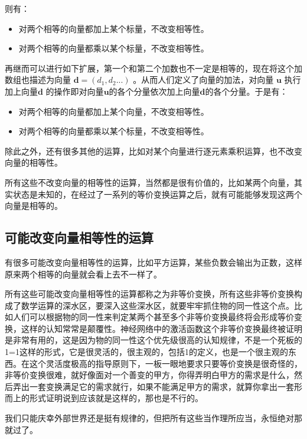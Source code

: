 \documentclass[12pt,oneside]{book}
\begin{document}
则有：

\begin{itemize}
\item 对两个相等的向量都加上某个标量，不改变相等性。
\item 对两个相等的向量都乘以某个标量，不改变相等性。
\end{itemize}

再继而可以进行如下扩展，第一个和第二个加数也不一定是相等的，现在将这个加数组也描述为向量 $\boldsymbol{d} = (d_1, d_2 ...)$ 。从而人们定义了向量的加法，对向量 $\boldsymbol{u}$ 执行加上向量$\boldsymbol{d}$ 的操作即对向量$\boldsymbol{u}$的各个分量依次加上向量$\boldsymbol{d}$的各个分量。于是有：


\begin{itemize}
\item 对两个相等的向量都加上某个向量，不改变相等性。
\item 对两个相等的向量都乘以某个标量，不改变相等性。
\end{itemize}

除此之外，还有很多其他的运算，比如对某个向量进行逐元素乘积运算，也不改变向量的相等性。

所有这些不改变向量的相等性的运算，当然都是很有价值的，比如某两个向量，其实状态是未知的，在经过了一系列的等价变换运算之后，就有可能能够发现这两个向量是相等的。


\subsection{可能改变向量相等性的运算}
有很多可能改变向量相等性的运算，比如平方运算，某些负数会输出为正数，这样原来两个相等的向量就会看上去不一样了。

所有这些可能改变向量相等性的运算都称之为非等价变换，所有这些非等价变换构成了数学运算的深水区，要深入这些深水区，就要牢牢抓住物的同一性这个点。比如人们可以根据物的同一性来判定某两个甚至多个非等价变换最终将会形成等价变换，这样的认知常常是颠覆性。神经网络中的激活函数这个非等价变换最终被证明是非常有用的，这是因为物的同一性这个优先级很高的认知规律，不是一个死板的1=1这样的形式，它是很灵活的，很主观的，包括1的定义，也是一个很主观的东西。在这个灵活度极高的指导原则下，一板一眼地要求只要等价变换是很奇怪的，非等价变换很难，就好像面对一个善变的甲方，你得弄明白甲方的需求是什么，然后弄出一套变换满足它的需求就行，如果不能满足甲方的需求，就算你拿出一套形而上的形式证明说到应该就是这样的，那也是不行的。

我们只能庆幸外部世界还是挺有规律的，但把所有这些当作理所应当，永恒绝对那就过了。
\end{document}
